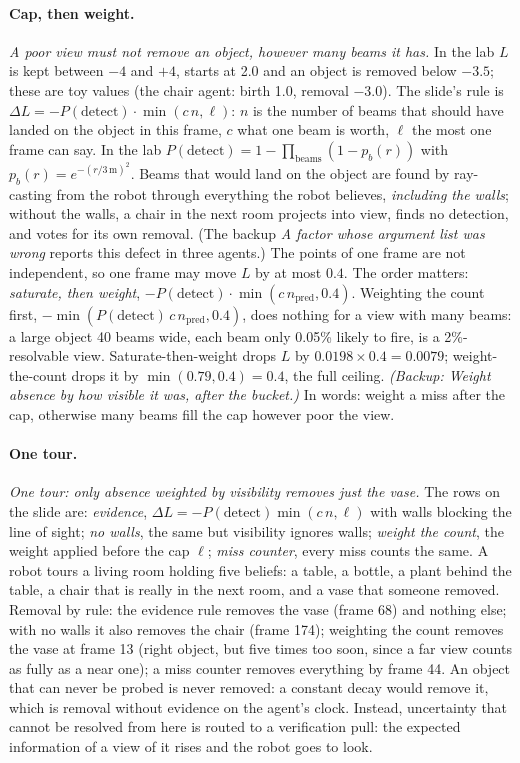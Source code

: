 \documentclass[11pt]{article}
\newcommand{\slt}[1]{\emph{#1}}   %
\begin{document}
\paragraph{Cap, then weight.} \slt{A poor view must not remove an object, however many beams it has.} In the lab $L$ is kept between $-4$ and $+4$, starts at 2.0 and an object is removed below $-3.5$; these are toy values (the chair agent: birth 1.0, removal $-3.0$). The slide's rule is $\Delta L=-P(\text{detect})\cdot\min(c\,n,\ell)$: $n$ is the number of beams that should have landed on the object in this frame, $c$ what one beam is worth, $\ell$ the most one frame can say. In the lab $P(\text{detect})=1-\prod_{\text{beams}}(1-p_b(r))$ with $p_b(r)=e^{-(r/3\,\text{m})^2}$. Beams that would land on the object are found by ray-casting from the robot through everything the robot believes, \emph{including the walls}; without the walls, a chair in the next room projects into view, finds no detection, and votes for its own removal. (The backup \slt{A factor whose argument list was wrong} reports this defect in three agents.) The points of one frame are not independent, so one frame may move $L$ by at most $0.4$. The order matters: \emph{saturate, then weight}, $-P(\text{detect})\cdot\min(c\,n_{\text{pred}},0.4)$. Weighting the count first, $-\min(P(\text{detect})\,c\,n_{\text{pred}},0.4)$, does nothing for a view with many beams: a large object 40 beams wide, each beam only 0.05\% likely to fire, is a 2\%-resolvable view. Saturate-then-weight drops $L$ by $0.0198\times0.4=0.0079$; weight-the-count drops it by $\min(0.79,0.4)=0.4$, the full ceiling. \slt{(Backup: Weight absence by how visible it was, after the bucket.)} In words: weight a miss after the cap, otherwise many beams fill the cap however poor the view.

\paragraph{One tour.} \slt{One tour: only absence weighted by visibility removes just the vase.} The rows on the slide are: \emph{evidence}, $\Delta L=-P(\text{detect})\min(c\,n,\ell)$ with walls blocking the line of sight; \emph{no walls}, the same but visibility ignores walls; \emph{weight the count}, the weight applied before the cap $\ell$; \emph{miss counter}, every miss counts the same. A robot tours a living room holding five beliefs: a table, a bottle, a plant behind the table, a chair that is really in the next room, and a vase that someone removed. Removal by rule: the evidence rule removes the vase (frame 68) and nothing else; with no walls it also removes the chair (frame 174); weighting the count removes the vase at frame 13 (right object, but five times too soon, since a far view counts as fully as a near one); a miss counter removes everything by frame 44. An object that can never be probed is never removed: a constant decay would remove it, which is removal without evidence on the agent's clock. Instead, uncertainty that cannot be resolved from here is routed to a verification pull: the expected information of a view of it rises and the robot goes to look.
\end{document}
